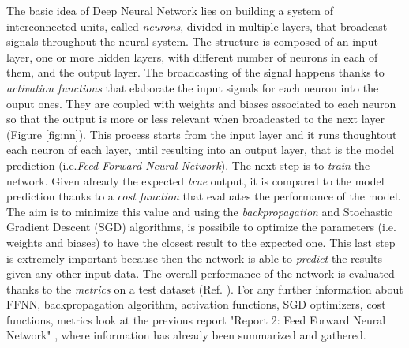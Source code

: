 \documentclass[english,notitlepage,reprint,nofootinbib]{revtex4-1}  %
\begin{document}
The basic idea of Deep Neural Network lies on building a system of interconnected units, called \textit{neurons}, divided in multiple layers, that broadcast signals throughout the neural system. The structure is composed of an input layer, one or more hidden layers, with different number of neurons in each of them, and the output layer. The broadcasting of the signal happens thanks to \textit{activation functions} that elaborate the input signals for each neuron into the ouput ones. They are coupled with weights and biases associated to each neuron so that the output is more or less relevant when broadcasted to the next layer (Figure \ref{fig:nn}). This process starts from the input layer and it runs thoughtout each neuron of each layer, until resulting into an output layer, that is the model prediction (i.e.\textit{Feed Forward Neural Network}). The next step is to \textit{train} the network. Given already the expected \textit{true} output, it is compared to the model prediction thanks to a \textit{cost function} that evaluates the performance of the model. The aim is to minimize this value and using the \textit{backpropagation} and Stochastic Gradient Descent (SGD) algorithms, is possibile to optimize the parameters (i.e. weights and biases) to have the closest result to the expected one. This last step is extremely important because then the network is able to \textit{predict} the results given any other input data. The overall performance of the network is evaluated thanks to the \textit{metrics} on a test dataset (Ref. \cite{mortens}). For any further information about FFNN, backpropagation algorithm, activation functions, SGD optimizers, cost  functions, metrics look at the previous report "Report 2: Feed Forward Neural Network" \cite{adele}, where information has already been summarized and gathered.
\end{document}
